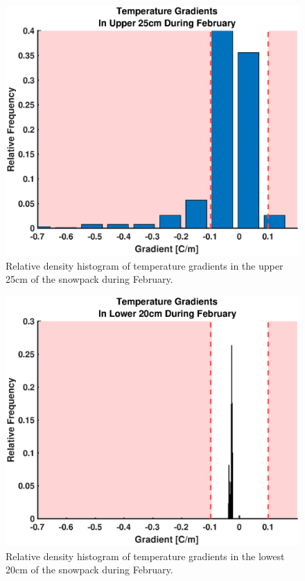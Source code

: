   \begin{figure}[H]
    \centering
    \includegraphics[width=0.7\linewidth]{figures/TempGrad/Feb_U25_RDH.eps}
    \caption{Relative density histogram of temperature gradients in the upper 25cm of the snowpack during February.}
    \label{fig:Feb_U25_RDH}
 \end{figure}
 
   \begin{figure}[H]
    \centering
    \includegraphics[width=0.7\linewidth]{figures/TempGrad/Feb_L20_RDH.eps}
    \caption{Relative density histogram of temperature gradients in the lowest 20cm of the snowpack during February.}
    \label{fig:Feb_L20_RDH}
 \end{figure}
 
